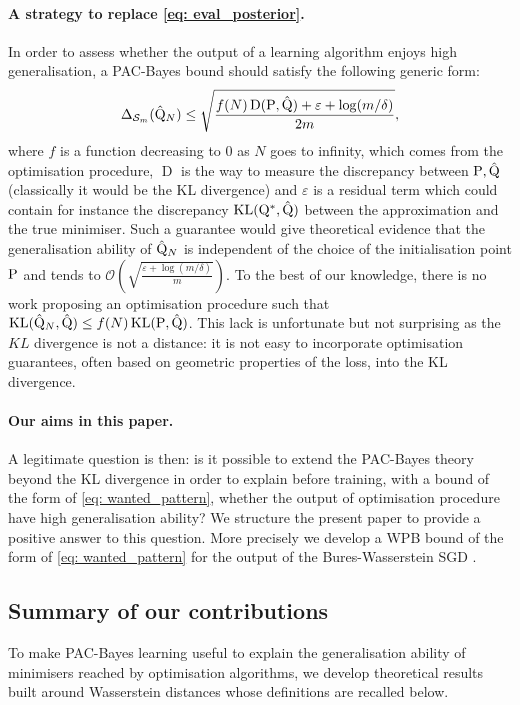 \paragraph{A strategy to replace \eqref{eq: eval_posterior}.}
In order to assess whether the output of a learning algorithm enjoys high generalisation, a PAC-Bayes bound should satisfy the following generic form:
\begin{align}
\label{eq: wanted_pattern}
\Delta_{\Sm}(\hat{\Q}_N) \leq \sqrt{\frac{f(N)\operatorname{D}(\P,\hat{\Q}) + \varepsilon+ \log(m/\delta)}{2m}},
\end{align}
where $f$ is a function decreasing to $0$ as $N$ goes to infinity, which comes from the optimisation procedure, $\operatorname{D}$ is the way to measure the discrepancy between $\P,\hat{\Q}$ (classically it would be the KL divergence) and $\varepsilon$ is a residual term which could contain for instance the discrepancy $\operatorname{KL}(\Q^*,\hat{\Q})$ between the approximation and the true minimiser.
Such a guarantee would give theoretical evidence that the generalisation ability of $\hat{\Q}_N$ is independent of the choice of the initialisation point $\P$ and tends to $\mathcal{O}\left( \sqrt{\frac{\varepsilon + \log(m/\delta)}{m}} \right)$.
To the best of our knowledge, there is no work proposing an optimisation procedure such that $\operatorname{KL}(\hat{\Q}_N,\hat{\Q}) \leq f(N)  \operatorname{KL}(\P,\hat{\Q})$.  This lack is unfortunate but not surprising as the $KL$ divergence is not a distance: it is not easy to incorporate optimisation guarantees, often based on geometric properties of the loss, into the KL divergence.

\paragraph{Our aims in this paper.}
A legitimate question is then: is it possible to extend the PAC-Bayes theory beyond the KL divergence in order to explain before training, with a bound of the form of \eqref{eq: wanted_pattern}, whether the output of optimisation procedure have high generalisation ability? We structure the present paper to provide a positive answer to this question. More precisely we develop a WPB bound of the form of \eqref{eq: wanted_pattern} for the output of the Bures-Wasserstein SGD \citep{lambert2022variational}.



\subsection{Summary of our contributions}
\label{sec: intro_contrib}
To make PAC-Bayes learning useful to explain the generalisation ability of minimisers reached by optimisation algorithms, we develop theoretical results built around Wasserstein distances whose definitions are recalled below.

